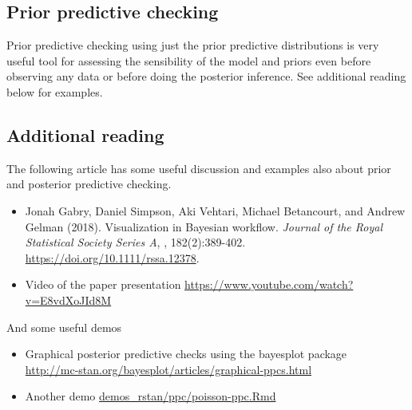 \documentclass[a4paper,11pt,english]{article}
\begin{document}
 \subsection*{Prior predictive checking}

 Prior predictive checking using just the prior predictive
 distributions is very useful tool for assessing the sensibility of
 the model and priors even before observing any data or before doing
 the posterior inference. See additional reading below for examples.
 
 \subsection*{Additional reading}

The following article has some useful discussion and examples also about prior and posterior predictive checking.
\begin{itemize}
\item  Jonah Gabry, Daniel Simpson, Aki Vehtari, Michael Betancourt, and Andrew Gelman (2018). Visualization in Bayesian workflow. {\em Journal of the Royal Statistical Society Series A}, , 182(2):389-402. \url{https://doi.org/10.1111/rssa.12378}.
\item Video of the paper presentation \url{https://www.youtube.com/watch?v=E8vdXoJId8M}
\end{itemize}

And some useful demos
\begin{itemize}
  \item Graphical posterior predictive checks using the bayesplot package\\
    \url{http://mc-stan.org/bayesplot/articles/graphical-ppcs.html}
  \item Another demo \href{http://avehtari.github.io/BDA_R_demos/demos_rstan/ppc/poisson-ppc.html}{demos\_rstan/ppc/poisson-ppc.Rmd}
  \end{itemize}
\end{document}
